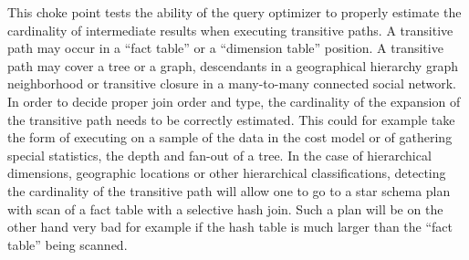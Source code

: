 
This choke point tests the ability of the query optimizer to properly estimate
the cardinality of intermediate results when executing transitive paths. A
transitive path may occur in a ``fact table'' or a ``dimension table'' position.
A transitive path may cover a tree or a graph, \eg descendants in a geographical
hierarchy \vs graph neighborhood or transitive closure in a many-to-many
connected social network. In order to decide proper join order and type, the
cardinality of the expansion of the transitive path needs to be correctly
estimated. This could for example take the form of executing on a sample of the
data in the cost model or of gathering special statistics, \eg the depth and
fan-out of a tree. In the case of hierarchical dimensions, \eg geographic
locations or other hierarchical classifications, detecting the cardinality of
the transitive path will allow one to go to a star schema plan with scan of a
fact table with a selective hash join. Such a plan will be on the other hand
very bad for example if the hash table is much larger than the ``fact table''
being scanned.


